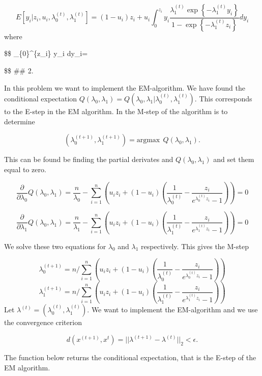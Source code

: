 \documentclass[
]{article}
\begin{document}
\[
E[y_i|z_i, u_i, \lambda_0^{(t)}, \lambda_1^{(t)}]=(1 - u_i) z_i + u_i \int_{0}^{z_i} y_i \frac{\lambda_1^{(t)} \exp\left\{-\lambda_1^{(t)} y_i\right\}}{1 - \exp\left\{-\lambda_1^{(t)} z_i\right\}} dy_i 
\]
where

\$\$
\int\_\{0\}\^{}\{z\_i\} y\_i  dy\_i=


\$\$
\#\# 2.

In this problem we want to implement the EM-algorithm. We have found the conditional expectation \(Q(\lambda_0,\lambda_1)=Q(\lambda_0, \lambda_1 | \lambda_0^{(t)}, \lambda_1^{(t)}).\) This corresponds to the E-step in the EM algorithm. In the M-step of the algorithm is to determine

\[
(\lambda_0^{(t+1)}, \lambda_1^{(t+1)})=\text{argmax} \ \ Q(\lambda_0, \lambda_1).
\]

This can be found be finding the partial derivates and \(Q(\lambda_0, \lambda_1)\) and set them equal to zero.

\[
\frac{\partial}{\partial \lambda_0} Q(\lambda_0, \lambda_1)=
\frac{n}{\lambda_0}-\sum_{i=1}^{n} \left ( u_i z_i+(1-u_i) \left ( \frac{1}{\lambda_0^{(t)}}-\frac{z_i}{e^{\lambda_0^{(t)}z_i}-1} \right ) \right)=0
\]

\[
\frac{\partial}{\partial \lambda_1} Q(\lambda_0, \lambda_1)=
\frac{n}{\lambda_1}-\sum_{i=1}^{n} \left ( u_i z_i+(1-u_i) \left ( \frac{1}{\lambda_1^{(t)}}-\frac{z_i}{e^{\lambda_1^{(t)}z_i}-1} \right ) \right)=0
\]

We solve these two equations for \(\lambda_0\) and \(\lambda_1\) respectively. This gives the M-step

\[
\lambda_0^{(t+1)}=n/\sum_{i=1}^{n} \left ( u_i z_i+(1-u_i) \left ( \frac{1}{\lambda_0^{(t)}}-\frac{z_i}{e^{\lambda_0^{(t)}z_i}-1} \right ) \right)
\]
\[
\lambda_1^{(t+1)}=n/\sum_{i=1}^{n} \left ( u_i z_i+(1-u_i) \left ( \frac{1}{\lambda_1^{(t)}}-\frac{z_i}{e^{\lambda_1^{(t)}z_i}-1} \right ) \right)
\]
Let \(\lambda^{(t)}=(\lambda_0^{(t)}, \lambda_1^{(t)}).\)
We want to implement the EM-algorithm and we use the convergence criterion

\[
d(x^{(t+1)}, x^{t})= || {\lambda}^{(t+1)} - {\lambda}^{(t)}||_2<\epsilon.
\]

The function below returns the conditional expectation, that is the E-step of the EM algorithm.
\end{document}

